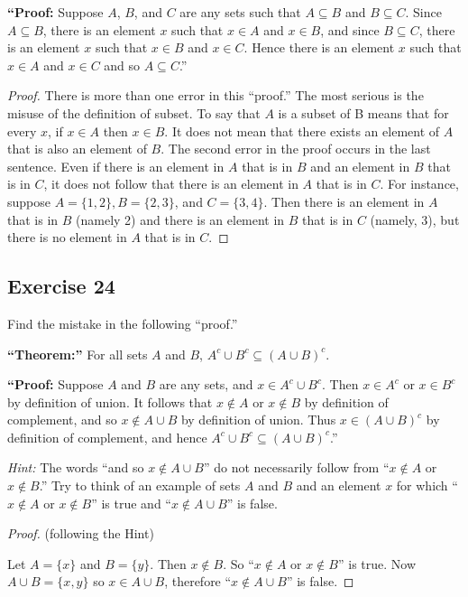 \documentclass[14pt]{extarticle}
\begin{document}
{\bf “Proof:} Suppose $A$, $B$, and $C$ are any sets such that \(A \subseteq B\) and \(B \subseteq C\). Since 
\(A \subseteq B\), there is an element $x$ such that \(x \in A\) and \(x \in B\), and since \(B \subseteq C\), there 
is an element $x$ such that \(x \in B\) and \(x \in C\). Hence there is an element $x$ such that \(x \in A\) and 
\(x \in C\) and so \(A \subseteq C\).”

\begin{proof}
There is more than one error in this “proof.” The most serious is the misuse of the definition of subset. To say 
that $A$ is a subset of B means that for every $x$, if $x \in A$ then $x \in B$. It does not mean that there exists 
an element of $A$ that is also an element of $B$. The second error in the proof occurs in the last sentence. Even 
if there is an element in $A$ that is in $B$ and an element in $B$ that is in $C$, it does not follow that there is an 
element in $A$ that is in $C$. For instance, suppose \(A = \{1, 2\}, B = \{2, 3\}\), and \(C = \{3, 4\}\). Then there 
is an element in $A$ that is in $B$ (namely 2) and there is an element in $B$ that is in $C$ (namely, 3), but there is 
no element in $A$ that is in $C$.
\end{proof}

\subsection{Exercise 24}
Find the mistake in the following “proof.”

{\bf “Theorem:”} For all sets $A$ and $B$, \(A^c \cup B^c \subseteq (A \cup B)^c\).

{\bf “Proof:} Suppose $A$ and $B$ are any sets, and \(x \in A^c \cup B^c\). Then \(x \in A^c\) or \(x \in B^c\) by 
definition of union. It follows that \(x \notin A\) or \(x \notin B\) by definition of complement, and so 
\(x \notin A \cup B\) by definition of union. Thus \(x \in (A \cup B)^c\) by definition of complement, and hence 
\(A^c \cup B^c \subseteq (A \cup B)^c\).”

{\it Hint:} The words “and so \(x \notin A \cup B\)” do not necessarily follow from “\(x \notin A\) or \(x \notin B\).” 
Try to think of an example of sets $A$ and $B$ and an element $x$ for which “\(x \notin A\) or \(x \notin B\)” is 
true and “\(x \notin A \cup B\)” is false.

\begin{proof}
(following the Hint)

Let \(A = \{x\}\) and \(B = \{y\}\). Then \(x \notin B\). So “\(x \notin A\) or \(x \notin B\)” is true. Now
\(A \cup B = \{x, y\}\) so \(x \in A \cup B\), therefore “\(x \notin A \cup B\)” is false.
\end{proof}
\end{document}
